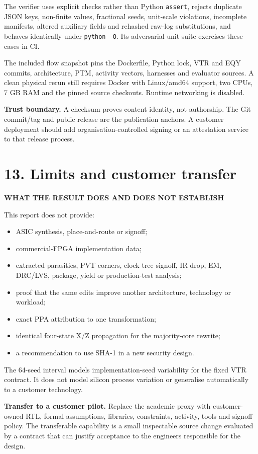 \documentclass[10pt,a4paper]{article}
\newcommand{\smallcaps}[1]{\textcolor{Mid}{\fontsize{8.5}{10}\selectfont\bfseries\MakeUppercase{#1}}}
\newcommand{\newpageheading}[2]{\clearpage\section{#1}\smallcaps{#2}\vspace{6pt}}
\begin{document}
The verifier uses explicit checks rather than Python \texttt{assert}, rejects duplicate JSON keys, non-finite values, fractional seeds, unit-scale violations, incomplete manifests, altered auxiliary fields and rehashed raw-log substitutions, and behaves identically under \texttt{python -O}. Its adversarial unit suite exercises these cases in CI.

The included flow snapshot pins the Dockerfile, Python lock, VTR and EQY commits, architecture, PTM, activity vectors, harnesses and evaluator sources. A clean physical rerun still requires Docker with Linux/amd64 support, two CPUs, 7 GB RAM and the pinned source checkouts. Runtime networking is disabled.

\begin{scopebox}
\textbf{Trust boundary.} A checksum proves content identity, not authorship. The Git commit/tag and public release are the publication anchors. A customer deployment should add organisation-controlled signing or an attestation service to that release process.
\end{scopebox}

\newpageheading{13. Limits and customer transfer}{What the result does and does not establish}

This report does not provide:
\begin{itemize}
  \item ASIC synthesis, place-and-route or signoff;
  \item commercial-FPGA implementation data;
  \item extracted parasitics, PVT corners, clock-tree signoff, IR drop, EM, DRC/LVS, package, yield or production-test analysis;
  \item proof that the same edits improve another architecture, technology or workload;
  \item exact PPA attribution to one transformation;
  \item identical four-state X/Z propagation for the majority-core rewrite;
  \item a recommendation to use SHA-1 in a new security design.
\end{itemize}

The 64-seed interval models implementation-seed variability for the fixed VTR contract. It does not model silicon process variation or generalise automatically to a customer technology.

\begin{claimbox}
\textbf{Transfer to a customer pilot.} Replace the academic proxy with customer-owned RTL, formal assumptions, libraries, constraints, activity, tools and signoff policy. The transferable capability is a small inspectable source change evaluated by a contract that can justify acceptance to the engineers responsible for the design.
\end{claimbox}
\end{document}
